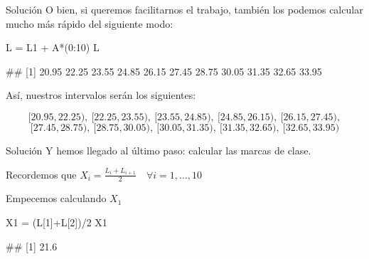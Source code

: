 \documentclass[
  ignorenonframetext,
  aspectratio=169]{beamer}
\newenvironment{Shaded}{\begin{snugshade}}{\end{snugshade}}
\newcommand{\DecValTok}[1]{\textcolor[rgb]{0.00,0.00,0.81}{#1}}
\newcommand{\NormalTok}[1]{#1}
\newcommand{\OtherTok}[1]{\textcolor[rgb]{0.56,0.35,0.01}{#1}}
\newcommand{\SpecialCharTok}[1]{\textcolor[rgb]{0.00,0.00,0.00}{#1}}
\let\oldverbatim\verbatim
\let\endoldverbatim\endverbatim
\renewenvironment{verbatim}{\tiny\oldverbatim}{\endoldverbatim}
\begin{document}
\begin{frame}[fragile]{Solución}
\protect\hypertarget{soluciuxf3n-7}{}
O bien, si queremos facilitarnos el trabajo, también los podemos
calcular mucho más rápido del siguiente modo:

\begin{Shaded}
\begin{Highlighting}[]
\NormalTok{L }\OtherTok{=}\NormalTok{ L1 }\SpecialCharTok{+}\NormalTok{ A}\SpecialCharTok{*}\NormalTok{(}\DecValTok{0}\SpecialCharTok{:}\DecValTok{10}\NormalTok{)}
\NormalTok{L}
\end{Highlighting}
\end{Shaded}

\begin{verbatim}
##  [1] 20.95 22.25 23.55 24.85 26.15 27.45 28.75 30.05 31.35 32.65 33.95
\end{verbatim}

Así, nuestros intervalos serán los siguientes:

\[[20.95,22.25),\ [22.25,23.55),\ [23.55,24.85),\ [24.85,26.15),\ [26.15,27.45),\]
\[[27.45,28.75),\ [28.75,30.05),\ [30.05,31.35),\ [31.35,32.65),\ [32.65,33.95)\]
\end{frame}

\begin{frame}[fragile]{Solución}
\protect\hypertarget{soluciuxf3n-8}{}
Y hemos llegado al último paso: calcular las marcas de clase.

Recordemos que
\(X_i = \frac{L_{i}+L_{i+1}}{2} \quad\forall i=1,\dots,10\)

Empecemos calculando \(X_1\)

\begin{Shaded}
\begin{Highlighting}[]
\NormalTok{X1 }\OtherTok{=}\NormalTok{ (L[}\DecValTok{1}\NormalTok{]}\SpecialCharTok{+}\NormalTok{L[}\DecValTok{2}\NormalTok{])}\SpecialCharTok{/}\DecValTok{2}
\NormalTok{X1}
\end{Highlighting}
\end{Shaded}

\begin{verbatim}
## [1] 21.6
\end{verbatim}
\end{frame}
\end{document}
